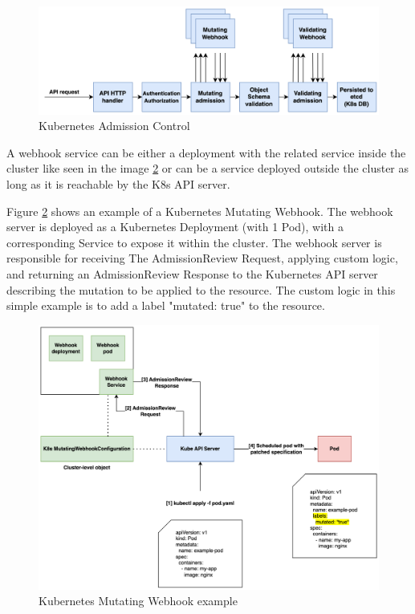 \begin{figure}[htb]
  \centering
  \includegraphics[width=1\linewidth]{images/k8s_admission.png}
  \caption{Kubernetes Admission Control}
  \label{fig:k8s_admission_control}
\end{figure}

A webhook service can be either a deployment with the related service inside the cluster like seen in the image \ref{fig:k8s_webhook_example} or can be a service deployed outside the cluster as long as it is reachable by the K8s API server.

Figure \ref{fig:k8s_webhook_example} shows an example of a Kubernetes Mutating Webhook. 
The webhook server is deployed as a Kubernetes Deployment (with 1 Pod), with a corresponding Service to expose it within the cluster. 
The webhook server is responsible for receiving The AdmissionReview Request, applying custom logic, and returning an AdmissionReview Response to the Kubernetes API server describing the mutation to be applied to the resource.
The custom logic in this simple example is to add a label "mutated: true" to the resource.

\begin{figure}[H]
  \centering
  \includegraphics[width=1\linewidth]{images/k8s_webhook_example.png}
  \caption{Kubernetes Mutating Webhook example \cite{kubernetes_mutating_webhook_example}}
  \label{fig:k8s_webhook_example}
\end{figure}

